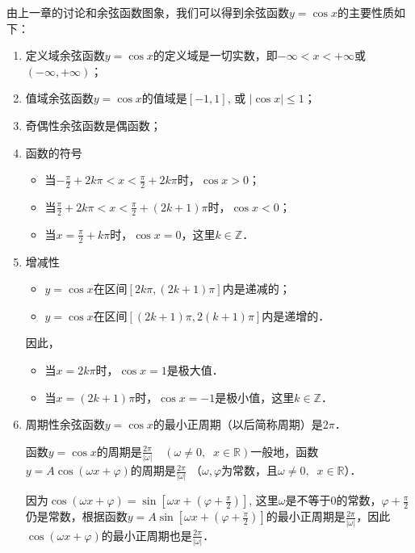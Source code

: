由上一章的讨论和余弦函数图象，我们可以得到余弦函数$y=\cos x$的主要性质如下：
\begin{enumerate}
\item 定义域\quad  余弦函数$y=\cos x$的定义域是一切实数，即$-\infty<x<+\infty$或$(-\infty, +\infty)$；
\item 值域\quad 余弦函数$y=\cos x$的值域是$[-1, 1]$, 或
$|\cos x|\le 1$；
\item 奇偶性\quad 余弦函数是偶函数；
\item 函数的符号
\begin{itemize}
    \item 当$-\frac{\pi}{2}+2k\pi<x<\frac{\pi}{2}+2k\pi$时，$\cos x>0$；
    \item 当$\frac{\pi}{2}+2k\pi<x<\frac{\pi}{2}+(2k+1)\pi$时，$\cos x<0$；
    \item 当$x=\frac{\pi}{2}+k\pi$时，$\cos x=0$，这里$k\in\mathbb{Z}$．
\end{itemize}

\item 增减性
\begin{itemize}
    \item $y=\cos x$在区间$[2k\pi,(2k+1)\pi]$内是递减的；
    \item $y=\cos x$在区间$[(2k+1)\pi,2(k+1)\pi]$内是递增的．
\end{itemize}
因此，
\begin{itemize}
    \item 当$x=2k\pi$时，$\cos x=1$是极大值．
    \item 当$x=(2k+1)\pi$时，$\cos x=-1$是极小值，这里$k\in\mathbb{Z}$．
\end{itemize}

\item 周期性\quad 余弦函数$y=\cos x$的最小正周期（以后简称周期）是$2\pi$．

函数$y=\cos x$的周期是$\frac{2\pi}{|\omega|}\quad (\omega\ne 0,\;\;x\in \mathbb{R})$一般地，函数$y=A\cos(\omega x+\varphi)$的周期是$\frac{2\pi}{|\omega|}$
（$\omega,\varphi$为常数，且$\omega\ne 0,\;\;x\in \mathbb{R}$）．

因为$\cos(\omega x+\varphi)=\sin\left[\omega x+\left(\varphi+\frac{\pi}{2}\right)\right]$, 这里$\omega$是不等于0的常数，$\varphi+\frac{\pi}{2}$仍是常数，根据函数$y=A\sin\left[\omega x+\left(\varphi+\frac{\pi}{2}\right)\right]$的最小正周期是$\frac{2\pi}{|\omega|}$，因此
$\cos(\omega x+\varphi)$的最小正周期也是$\frac{2\pi}{|\omega|}$．

\end{enumerate}

